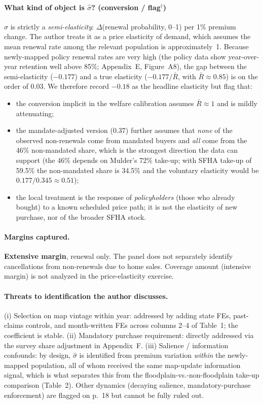 \documentclass[11pt]{article}
\begin{document}
\paragraph{What kind of object is $\hat\sigma$? (conversion / flag$^\dagger$)}
$\hat\sigma$ is strictly a \emph{semi-elasticity}: $\Delta$(renewal probability,
0--1) per 1\% premium change. The author treats it as a price elasticity
of demand, which assumes the mean renewal rate among the relevant
population is approximately~1. Because newly-mapped policy renewal rates
are very high (the policy data show year-over-year retention well above
85\%; Appendix~E, Figure~A8), the gap between the semi-elasticity
($-0.177$) and a true elasticity ($-0.177/\bar{R}$, with $\bar{R}\approx 0.85$)
is on the order of $0.03$. We therefore record $-0.18$ as the headline
elasticity but flag that:
\begin{itemize}
\item the conversion implicit in the welfare calibration assumes
$\bar{R}\approx 1$ and is mildly attenuating;
\item the mandate-adjusted version ($0.37$) further assumes that
\emph{none} of the observed non-renewals come from mandated buyers and
\emph{all} come from the 46\% non-mandated share, which is the strongest
direction the data can support (the 46\% depends on Mulder's 72\% take-up;
with SFHA take-up of 59.5\% the non-mandated share is 34.5\% and the
voluntary elasticity would be $0.177/0.345 \approx 0.51$);
\item the local treatment is the response of \emph{policyholders} (those
who already bought) to a known scheduled price path; it is not the
elasticity of new purchase, nor of the broader SFHA stock.
\end{itemize}

\paragraph{Margins captured.}
\textbf{Extensive margin}, renewal only. The panel does not separately
identify cancellations from non-renewals due to home sales. Coverage
amount (intensive margin) is not analyzed in the price-elasticity
exercise.

\paragraph{Threats to identification the author discusses.}
(i) Selection on map vintage within year: addressed by adding state FEs,
past-claims controls, and month-written FEs across columns 2--4 of
Table~1; the coefficient is stable.
(ii) Mandatory purchase requirement: directly addressed via the survey
share adjustment in Appendix~F.
(iii) Salience / information confounds: by design, $\hat\sigma$ is
identified from premium variation \emph{within} the newly-mapped
population, all of whom received the same map-update information signal,
which is what separates this from the floodplain-vs.-non-floodplain
take-up comparison (Table~2). Other dynamics (decaying salience,
mandatory-purchase enforcement) are flagged on p.~18 but cannot be
fully ruled out.
\end{document}
